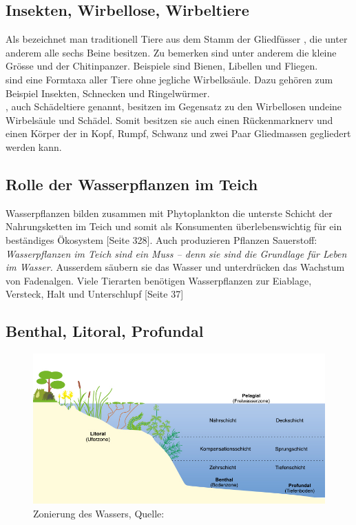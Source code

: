 \documentclass{article}
\begin{document}
    \subsection{Insekten, Wirbellose, Wirbeltiere}
    
        Als  bezeichnet man traditionell Tiere aus dem Stamm der Gliedfüsser , die unter anderem alle sechs Beine besitzen. Zu bemerken sind unter anderem die kleine Grösse und der Chitinpanzer. Beispiele sind Bienen, Libellen und Fliegen. \cite{EvolutionofInsects} \\
        \vspace{5mm}
         sind eine Formtaxa \cite{UniProtokolle} aller Tiere ohne jegliche Wirbelksäule. Dazu gehören zum Beispiel Insekten, Schnecken und Ringelwürmer. \cite{FrustfreiLernen} \\
        \vspace{5mm}
        , auch Schädeltiere genannt,  besitzen im Gegensatz zu den Wirbellosen undeine Wirbelsäule und Schädel. Somit besitzen sie auch einen Rückenmarknerv und einen Körper der in Kopf, Rumpf, Schwanz und zwei Paar Gliedmassen gegliedert werden kann. \cite{Lernhelfer}
        
    \subsection{Rolle der Wasserpflanzen im Teich}
    
        Wasserpflanzen bilden zusammen mit Phytoplankton die unterste Schicht der Nahrungsketten im Teich und somit als Konsumenten überlebenswichtig für ein beständiges Ökosystem \cite{Biobuch} [Seite 328]. Auch produzieren Pflanzen Sauerstoff: \textit{Wasserpflanzen im Teich sind ein Muss – denn sie sind die Grundlage für Leben im Wasser.}  Ausserdem säubern sie das Wasser und unterdrücken das Wachstum von Fadenalgen. \cite{Lupos} Viele Tierarten benötigen Wasserpflanzen zur Eiablage, Versteck, Halt und Unterschlupf \cite{Was} [Seite 37]
    
    \subsection{Benthal, Litoral, Profundal}
    
        \begin{figure}[h!]
        \centering
        \includegraphics[scale=0.4]{zonierung.jpg}
        \caption{Zonierung des Wassers, Quelle: \cite{klasseWasser}}
        \label{fig:universe}
        \end{figure}
        
\end{document}
